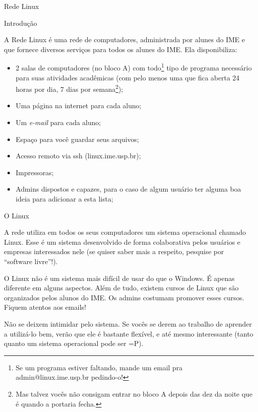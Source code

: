 \begin{subsecao}{Rede Linux}


\begin{subsubsecao}{Introdução}

A Rede Linux é uma rede de computadores, administrada por alunes do IME e
que fornece diversos serviços para todos os alunes do IME.
Ela disponibiliza:

\vspace{-1em}

\begin{itemize}
\item 2 salas de computadores (no bloco A) com todo\footnote{ Se um programa
estiver faltando, mande um email pra admin@linux.ime.usp.br pedindo-o!} tipo de
programa necessário para suas atividades acadêmicas (com pelo menos uma que fica
aberta 24 horas por dia, 7 dias por semana\footnote{ Mas talvez vocês não
consigam entrar no bloco A depois das dez da noite que é quando a portaria
fecha.});
\item Uma página na internet para cada aluno;
\item Um \textit{e-mail} para cada aluno;
\item Espaço para você guardar seus arquivos;
\item Acesso remoto via ssh (linux.ime.usp.br);
\item Impressoras;
\item Admins dispostos e capazes, para o caso de algum usuário ter alguma boa
ideia para adicionar a esta lista;
\end{itemize}
\end{subsubsecao}

\begin{subsubsecao}{O Linux}

A rede utiliza em todos os seus computadores um sistema operacional chamado
Linux. Esse é um sistema desenvolvido de forma colaborativa pelos usuários
e empresas interessados nele (se quiser saber mais a respeito, pesquise
por ``software livre''!).

O Linux não é um sistema mais difícil de usar do que o Windows. É apenas
diferente em alguns aspectos. Além de tudo, existem cursos de Linux que são
organizados pelos alunos do IME. Os admins costumam promover esses cursos.
Fiquem atentos aos emails!

Não se deixem intimidar pelo sistema. Se vocês se derem ao trabalho de
aprender a utilizá-lo bem, verão que ele é bastante flexível, e até mesmo
interessante (tanto quanto um sistema operacional pode ser =P).


\end{subsubsecao}
\end{subsecao}
